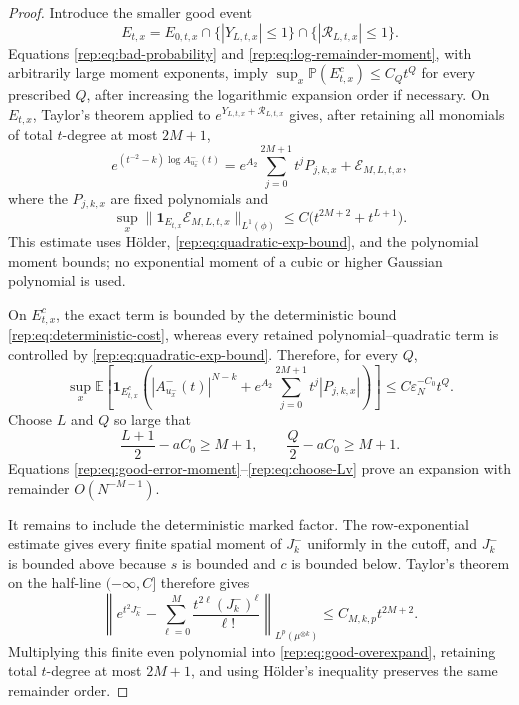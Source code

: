 \documentclass[11pt,reqno]{amsart}
\numberwithin{equation}{section}
\theoremstyle{plain}
\theoremstyle{definition}
\newcommand{\E}{\mathbb E}
\newcommand{\vep}{\varepsilon}
\begin{document}
\begin{proof}
Introduce the smaller good event
\begin{equation}\label{rep:eq:very-good}
 E_{t,x}=E_{0,t,x}\cap\{|Y_{L,t,x}|\le1\}\cap\{|\mathcal R_{L,t,x}|\le1\}.
\end{equation}
Equations \eqref{rep:eq:bad-probability} and \eqref{rep:eq:log-remainder-moment}, with arbitrarily large moment exponents, imply
$\sup_x\mathbb P(E_{t,x}^c)\le C_Qt^Q$ for every prescribed $Q$, after increasing the logarithmic expansion order if necessary.  On $E_{t,x}$, Taylor's theorem applied to
$e^{Y_{L,t,x}+\mathcal R_{L,t,x}}$ gives, after retaining all monomials of total $t$-degree at most $2M+1$,
\begin{equation}\label{rep:eq:good-overexpand}
 e^{(t^{-2}-k)\log A^-_{u_x^-}(t)}
 =e^{A_2}\sum_{j=0}^{2M+1}t^jP_{j,k,x}
 +\mathcal E_{M,L,t,x},
\end{equation}
where the $P_{j,k,x}$ are fixed polynomials and
\begin{equation}\label{rep:eq:good-error-moment}
 \sup_x\|\mathbf1_{E_{t,x}}\mathcal E_{M,L,t,x}\|_{L^1(\phi)}
 \le C\bigl(t^{2M+2}+t^{L+1}\bigr).
\end{equation}
This estimate uses H\"older, \eqref{rep:eq:quadratic-exp-bound}, and the polynomial moment bounds; no exponential moment of a cubic or higher Gaussian polynomial is used.

On $E_{t,x}^c$, the exact term is bounded by the deterministic bound \eqref{rep:eq:deterministic-cost}, whereas every retained polynomial--quadratic term is controlled by \eqref{rep:eq:quadratic-exp-bound}.  Therefore, for every $Q$,
\begin{equation}\label{rep:eq:bad-overexpand}
 \sup_x\E\left[\mathbf1_{E_{t,x}^c}
 \left(
 |A^-_{u_x^-}(t)|^{N-k}
 +e^{A_2}\sum_{j=0}^{2M+1}t^j|P_{j,k,x}|
 \right)\right]
 \le C\vep_N^{-C_0}t^Q.
\end{equation}
Choose $L$ and $Q$ so large that
\begin{equation}\label{rep:eq:choose-Lv}
 \frac{L+1}{2}-aC_0\ge M+1,
 \qquad \frac Q2-aC_0\ge M+1.
\end{equation}
Equations \eqref{rep:eq:good-error-moment}--\eqref{rep:eq:choose-Lv} prove an expansion with remainder $O(N^{-M-1})$.

It remains to include the deterministic marked factor.  The row-exponential estimate gives every finite spatial moment of $J_k^-$ uniformly in the cutoff, and $J_k^-$ is bounded above because $s$ is bounded and $c$ is bounded below.  Taylor's theorem on the half-line $(-\infty,C]$ therefore gives
\begin{equation}\label{rep:eq:exterior-factor-expansion}
 \left\|e^{t^2J_k^-}
 -\sum_{\ell=0}^{M}\frac{t^{2\ell}(J_k^-)^\ell}{\ell!}\right\|_{L^p(\mu^{\otimes k})}
 \le C_{M,k,p}t^{2M+2}.
\end{equation}
Multiplying this finite even polynomial into \eqref{rep:eq:good-overexpand}, retaining total $t$-degree at most $2M+1$, and using H\"older's inequality preserves the same remainder order.


\end{proof}
\end{document}
